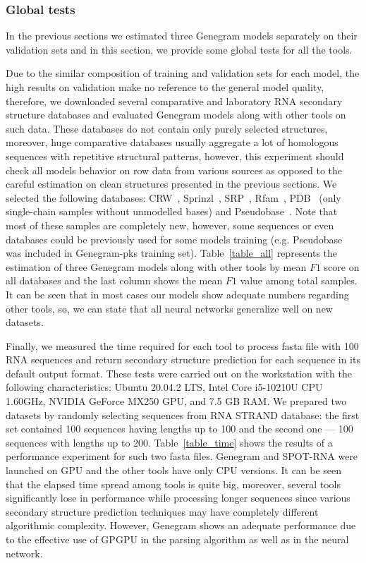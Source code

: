 

\subsubsection{Global tests}
In the previous sections we estimated three Genegram models separately on their validation sets and in this section, we provide some global tests for all the tools.

Due to the similar composition of training and validation sets for each model, the high results on validation make no reference to the general model quality, therefore, we downloaded several comparative and laboratory RNA secondary structure databases and evaluated Genegram models along with other tools on such data. These databases do not contain only purely selected structures, moreover, huge comparative databases usually aggregate a lot of homologous sequences with repetitive structural patterns, however, this experiment should check all models behavior on row data from various sources as opposed to the careful estimation on clean structures presented in the previous sections. We selected the following databases: CRW~\cite{cannone2002comparative}, Sprinzl~\cite{sprinzl1998compilation}, SRP~\cite{zwieb1992signal}, Rfam~\cite{griffiths2003rfam}, PDB~\cite{berman2000protein} (only single-chain samples without unmodelled bases) and Pseudobase~\cite{van2000pseudobase}. Note that most of these samples are completely new, however, some sequences or even databases could be previously used for some models training (e.g. Pseudobase was included in Genegram-pks training set). Table~\ref{table_all} represents the estimation of three Genegram models along with other tools by mean $F1$ score on all databases and the last column shows the mean $F1$ value among total samples. It can be seen that in most cases our models show adequate numbers regarding other tools, so, we can state that all neural networks generalize well on new datasets.



Finally, we measured the time required for each tool to process fasta file with 100 RNA sequences and return secondary structure prediction for each sequence in its default output format. These tests were carried out on the workstation with the following characteristics: Ubuntu 20.04.2 LTS, Intel Core i5-10210U CPU 1.60GHz, NVIDIA GeForce MX250 GPU, and 7.5 GB RAM. We prepared two datasets by randomly selecting sequences from RNA STRAND database: the first set contained 100 sequences having lengths up to 100 and the second one --- 100 sequences with lengths up to 200. Table~\ref{table_time} shows the results of a performance experiment for such two fasta files. Genegram and SPOT-RNA were launched on GPU and the other tools have only CPU versions. It can be seen that the elapsed time spread among tools is quite big, moreover, several tools significantly lose in performance while processing longer sequences since various secondary structure prediction techniques may have completely different algorithmic complexity. However, Genegram shows an adequate performance due to the effective use of GPGPU in the parsing algorithm as well as in the neural network.

